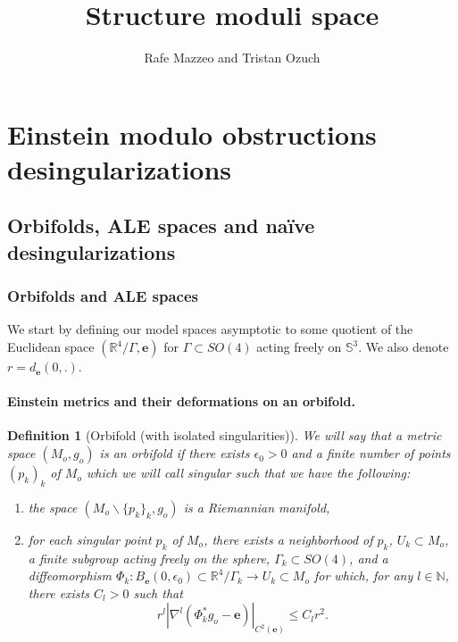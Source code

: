 \documentclass[12pt]{article}
\title{Structure moduli space}
\author{Rafe Mazzeo and Tristan Ozuch}
\date{ }
\newtheorem{defn}[thm]{Definition}
\begin{document}
\maketitle


  \tableofcontents

  \section{Einstein modulo obstructions desingularizations}

\subsection{Orbifolds, ALE spaces and naïve desingularizations}

\subsubsection{Orbifolds and ALE spaces}

We start by defining our model spaces asymptotic to some quotient of the Euclidean space $(\mathbb{R}^4\slash\Gamma,\mathbf{e})$ for $\Gamma\subset SO(4)$ acting freely on $\mathbb{S}^3$. We also denote $r=d_\mathbf{e}(0,.)$.

\paragraph{Einstein metrics and their deformations on an orbifold.}

\begin{defn}[Orbifold (with isolated singularities)]\label{orb Ein}
    We will say that a metric space $(M_o,g_o)$ is an orbifold if there exists $\epsilon_0>0$ and a finite number of points $(p_k)_k$ of $M_o$ which we will call \emph{singular} such that we have the following:
    \begin{enumerate}
        \item the space $(M_o\backslash\{p_k\}_k,g_o)$ is a Riemannian manifold,
        \item for each singular point $p_k$ of $M_o$, there exists a neighborhood of $p_k$, $ U_k\subset M_o$, a finite subgroup acting freely on the sphere, $\Gamma_k\subset SO(4)$, and a diffeomorphism $ \Phi_k: B_\mathbf{e}(0,\epsilon_0)\subset\mathbb{R}^4\slash\Gamma_k \to U_k\subset M_o $ for which, for any $l\in \mathbb{N}$, there exists $C_l>0$ such that $$r^l|\nabla^l(\Phi_k^* g_o - \mathbf{e})|_{C^2(\mathbf{e})}\leqslant C_l r^2.$$
    \end{enumerate}
\end{defn}
\end{document}
